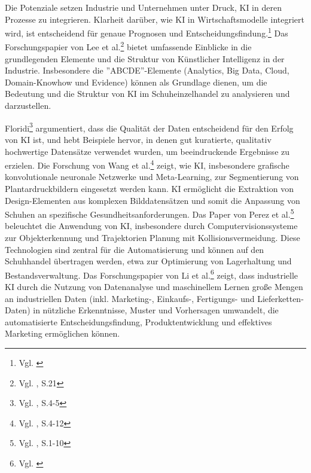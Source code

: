 Die Potenziale setzen Industrie und Unternehmen unter Druck, KI in deren Prozesse zu integrieren. Klarheit darüber, wie KI in Wirtschaftsmodelle integriert wird, ist entscheidend für genaue Prognosen und Entscheidungsfindung.\footnote{Vgl. \cite{Lu2021}} Das Forschungspapier von Lee et al.\footnote{Vgl. \cite{Lee2018}, S.21} bietet umfassende Einblicke in die grundlegenden Elemente und die Struktur von Künstlicher Intelligenz in der Industrie. Insbesondere die ''ABCDE''-Elemente (Analytics, Big Data, Cloud, Domain-Knowhow und Evidence) können als Grundlage dienen, um die Bedeutung und die Struktur von KI im Schuheinzelhandel zu analysieren und darzustellen. 

Floridi\footnote{Vgl. \cite{Floridi2019}, S.4-5} argumentiert, dass die Qualität der Daten entscheidend für den Erfolg von KI ist, und hebt Beispiele hervor, in denen gut kuratierte, qualitativ hochwertige Datensätze verwendet wurden, um beeindruckende Ergebnisse zu erzielen. Die Forschung von Wang et al.\footnote{Vgl. \cite{Wang2024}, S.4-12} zeigt, wie KI, insbesondere grafische konvolutionale neuronale Netzwerke und Meta-Learning, zur Segmentierung von Plantardruckbildern eingesetzt werden kann. KI ermöglicht die Extraktion von Design-Elementen aus komplexen Bilddatensätzen und somit die Anpassung von Schuhen an spezifische Gesundheitsanforderungen. Das Paper von Perez et al.\footnote{Vgl. \cite{Perez2018}, S.1-10} beleuchtet die Anwendung von KI, insbesondere durch Computervisionssysteme zur Objekterkennung und Trajektorien Planung mit Kollisionsvermeidung. Diese Technologien sind zentral für die Automatisierung und können auf den Schuhhandel übertragen werden, etwa zur Optimierung von Lagerhaltung und Bestandsverwaltung. Das Forschungspapier von Li et al.\footnote{Vgl. \cite{Shuyang2021}} zeigt, dass industrielle KI durch die Nutzung von Datenanalyse und maschinellem Lernen große Mengen an industriellen Daten (inkl. Marketing-, Einkaufs-, Fertigungs- und Lieferketten-Daten) in nützliche Erkenntnisse, Muster und Vorhersagen umwandelt, die automatisierte Entscheidungsfindung, Produktentwicklung und effektives Marketing ermöglichen können.

\newpage